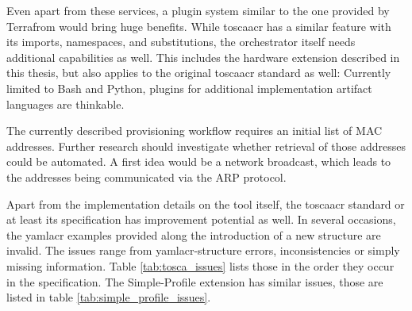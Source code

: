Even apart from these services, a plugin system similar to the one provided by Terrafrom would bring huge benefits. While \gls{toscaacr} has a similar feature with its imports, namespaces, and substitutions, the orchestrator itself needs additional capabilities as well. This includes the hardware extension described in this thesis, but also applies to the original \gls{toscaacr} standard as well: Currently limited to Bash and Python, plugins for additional implementation artifact languages are thinkable.

The currently described provisioning workflow requires an initial list of MAC addresses. Further research should investigate whether retrieval of those addresses could be automated. A first idea would be a network broadcast, which leads to the addresses being communicated via the ARP protocol.


Apart from the implementation details on the tool itself, the \gls{toscaacr} standard or at least its specification has improvement potential as well. In several occasions, the \gls{yamlacr} examples provided along the introduction of a new structure are invalid. The issues range from \gls{yamlacr}-structure errors, inconsistencies or simply missing information. Table \ref{tab:tosca_issues} lists those in the order they occur in the specification. The Simple-Profile extension has similar issues, those are listed in table \ref{tab:simple_profile_issues}.

